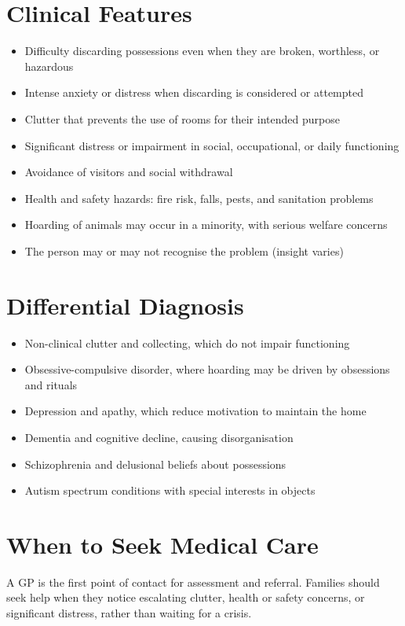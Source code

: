 \section*{Clinical Features}
\begin{itemize}
    \item Difficulty discarding possessions even when they are broken, worthless, or hazardous
    \item Intense anxiety or distress when discarding is considered or attempted
    \item Clutter that prevents the use of rooms for their intended purpose
    \item Significant distress or impairment in social, occupational, or daily functioning
    \item Avoidance of visitors and social withdrawal
    \item Health and safety hazards: fire risk, falls, pests, and sanitation problems
    \item Hoarding of animals may occur in a minority, with serious welfare concerns
    \item The person may or may not recognise the problem (insight varies)
\end{itemize}

\section*{Differential Diagnosis}
\begin{itemize}
    \item Non-clinical clutter and collecting, which do not impair functioning
    \item Obsessive-compulsive disorder, where hoarding may be driven by obsessions and rituals
    \item Depression and apathy, which reduce motivation to maintain the home
    \item Dementia and cognitive decline, causing disorganisation
    \item Schizophrenia and delusional beliefs about possessions
    \item Autism spectrum conditions with special interests in objects
\end{itemize}

\section*{When to Seek Medical Care}
A GP is the first point of contact for assessment and referral. Families should seek help when they notice escalating clutter, health or safety concerns, or significant distress, rather than waiting for a crisis.

